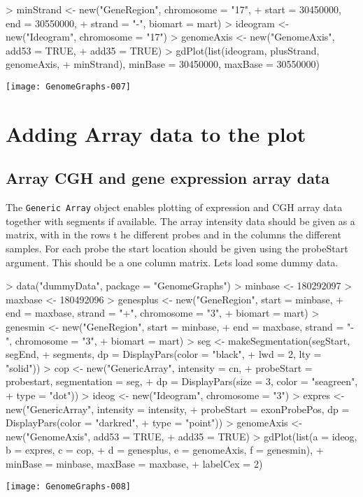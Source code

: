 \documentclass[11pt]{article}
\newcommand{\Robject}[1]{{\texttt{#1}}}
\begin{document}
\begin{Schunk}
\begin{Sinput}
> minStrand <- new("GeneRegion", chromosome = "17", 
+     start = 30450000, end = 30550000, 
+     strand = "-", biomart = mart)
> ideogram <- new("Ideogram", chromosome = "17")
> genomeAxis <- new("GenomeAxis", add53 = TRUE, 
+     add35 = TRUE)
> gdPlot(list(ideogram, plusStrand, genomeAxis, 
+     minStrand), minBase = 30450000, maxBase = 30550000)
\end{Sinput}
\end{Schunk}
\texttt{[image: GenomeGraphs-007]}

\section{Adding Array data to the plot}

\subsection{Array CGH and gene expression array data}
The \Robject{Generic Array} object enables plotting of expression and
CGH array data together with segments if available.  The array
intensity data should be given as a matrix, with in the rows t he
different probes and in the columns the different samples.  For each
probe the start location should be given using the probeStart
argument.  This should be a one column matrix.  Lets load some dummy
data.

\begin{Schunk}
\begin{Sinput}
> data("dummyData", package = "GenomeGraphs")
> minbase <- 180292097
> maxbase <- 180492096
> genesplus <- new("GeneRegion", start = minbase, 
+     end = maxbase, strand = "+", chromosome = "3", 
+     biomart = mart)
> genesmin <- new("GeneRegion", start = minbase, 
+     end = maxbase, strand = "-", chromosome = "3", 
+     biomart = mart)
> seg <- makeSegmentation(segStart, segEnd, 
+     segments, dp = DisplayPars(color = "black", 
+         lwd = 2, lty = "solid"))
> cop <- new("GenericArray", intensity = cn, 
+     probeStart = probestart, segmentation = seg, 
+     dp = DisplayPars(size = 3, color = "seagreen", 
+         type = "dot"))
> ideog <- new("Ideogram", chromosome = "3")
> expres <- new("GenericArray", intensity = intensity, 
+     probeStart = exonProbePos, dp = DisplayPars(color = "darkred", 
+         type = "point"))
> genomeAxis <- new("GenomeAxis", add53 = TRUE, 
+     add35 = TRUE)
> gdPlot(list(a = ideog, b = expres, c = cop, 
+     d = genesplus, e = genomeAxis, f = genesmin), 
+     minBase = minbase, maxBase = maxbase, 
+     labelCex = 2)
\end{Sinput}
\end{Schunk}
\texttt{[image: GenomeGraphs-008]}
\end{document}
